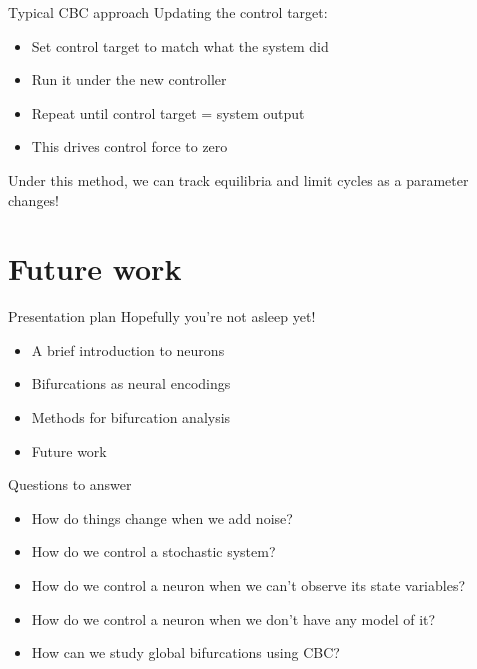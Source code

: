 \documentclass[presentation]{beamer}
\begin{document}
\begin{frame}[label={sec:orgc877400}]{Typical CBC approach}
Updating the control target:
\begin{itemize}
\item Set control target to match what the system did
\item Run it under the new controller
\item Repeat until control target = system output
\item This drives control force to zero
\end{itemize}

Under this method, we can track equilibria and limit cycles as a parameter changes!
\end{frame}


\section{Future work}
\label{sec:org9f8d068}
\begin{frame}[label={sec:orgc14b200}]{Presentation plan}
Hopefully you're not asleep yet!
\begin{itemize}
\item A brief introduction to neurons
\item Bifurcations as neural encodings
\item Methods for bifurcation analysis
\item \color{bristolred} Future work
\end{itemize}
\end{frame}

\begin{frame}[label={sec:org814d9c8}]{Questions to answer}
\begin{itemize}
\item How do things change when we add noise?
\item How do we control a stochastic system?
\item How do we control a neuron when we can't observe its state variables?
\item How do we control a neuron when we don't have any model of it?
\item How can we study global bifurcations using CBC?
\end{itemize}
\end{frame}
\end{document}
